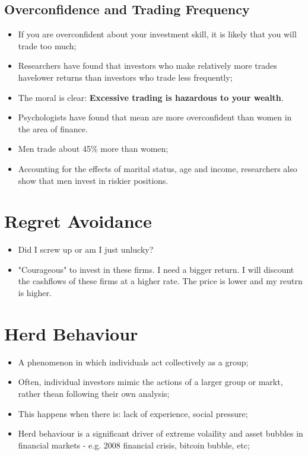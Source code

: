 \documentclass[11pt,a4paper]{report}
\begin{document}
\subsection{Overconfidence and Trading Frequency}
\begin{itemize}
    \item If you are overconfident about your investment skill, it is likely that you will trade too much;
    \item Researchers have found that investors who make relatively more trades havelower returns than investors who trade less frequently;
    \item The moral is clear: \textbf{Excessive trading is hazardous to your wealth}.
    \item Psychologists have found that mean are more overconfident than women in the area of finance.
    \item Men trade about 45\% more than women;
    \item Accounting for the effects of marital status, age and income, researchers also show that men invest in riskier positions.
\end{itemize}
\section{Regret Avoidance}
\begin{itemize}
    \item Did I screw up or am I just unlucky?
    \item "Courageous" to invest in these firms. I need a bigger return. I will discount the cashflows of these firms at a higher rate. The price is lower and my reutrn is higher.
\end{itemize}
\section{Herd Behaviour}
\begin{itemize}
    \item A phenomenon in which individuals act collectively as a group;
    \item Often, individual investors mimic the actions of a larger group or markt, rather thean following their own analysis;
    \item This happens when there is: lack of experience, social pressure;
    \item Herd behaviour is a significant driver of extreme volaility and asset bubbles in financial markets - e.g. 2008 financial crisis, bitcoin bubble, etc;
\end{itemize}
\end{document}
